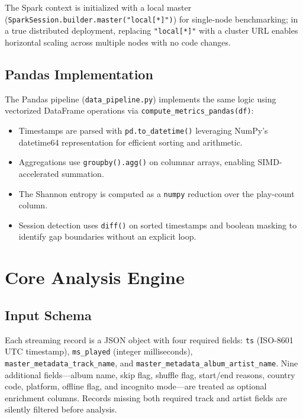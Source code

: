 \documentclass[conference]{IEEEtran}
\begin{document}
The Spark context is initialized with a local master
(\texttt{SparkSession.builder.master("local[*]")}) for single-node
benchmarking; in a true distributed deployment, replacing
\texttt{"local[*]"} with a cluster URL enables horizontal scaling
across multiple nodes with no code changes.

\subsection{Pandas Implementation}

The Pandas pipeline (\texttt{data\_pipeline.py}) implements the same logic
using vectorized DataFrame operations via \texttt{compute\_metrics\_pandas(df)}:

\begin{itemize}
  \item Timestamps are parsed with \texttt{pd.to\_datetime()} leveraging
        NumPy's datetime64 representation for efficient sorting and arithmetic.
  \item Aggregations use \texttt{groupby().agg()} on columnar arrays,
        enabling SIMD-accelerated summation.
  \item The Shannon entropy is computed as a \texttt{numpy} reduction over
        the play-count column.
  \item Session detection uses \texttt{diff()} on sorted timestamps and
        boolean masking to identify gap boundaries without an explicit loop.
\end{itemize}

\section{Core Analysis Engine}

\subsection{Input Schema}

Each streaming record is a JSON object with four required fields:
\texttt{ts} (ISO-8601 UTC timestamp), \texttt{ms\_played} (integer
milliseconds), \texttt{master\_metadata\_track\_name}, and
\texttt{master\_metadata\_album\_artist\_name}. Nine additional fields—album
name, skip flag, shuffle flag, start/end reasons, country code, platform,
offline flag, and incognito mode—are treated as optional enrichment columns.
Records missing both required track and artist fields are silently filtered
before analysis.
\end{document}
